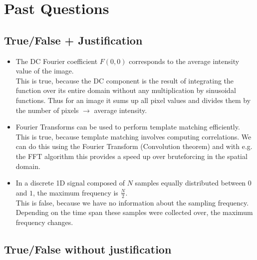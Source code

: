 \section{Past Questions}
\subsection{True/False + Justification} 
\begin{itemize}
    \item[\cmark] The DC Fourier coefficient \( F(0,0) \) corresponds to the average intensity value of the image.\\
    This is true, because the DC component is the result of integrating the function over its entire domain without any multiplication by sinusoidal functions. Thus for an image it sums up all pixel values and divides them by the number of pixels \( \to  \) average intensity.
    \item[\cmark] Fourier Transforms can be used to perform template matching efficiently.\\
    This is true, because template matching involves computing correlations. We can do this using the Fourier Transform (Convolution theorem) and with e.g. the FFT algorithm this provides a speed up over bruteforcing in the spatial domain.
    \item[\xmark] In a discrete 1D signal composed of \( N \) samples equally distributed between \( 0 \) and \( 1 \), the maximum frequency is \( \frac{N}{2} \).\\
    This is false, because we have no information about the sampling frequency. Depending on the time span these samples were collected over, the maximum frequency changes.
\end{itemize}

\subsection{True/False without justification}

